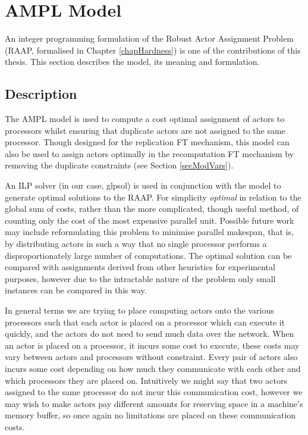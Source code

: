 \section{AMPL Model}

An integer programming formulation of the Robust Actor Assignment Problem (RAAP, formalised in Chapter \ref{chapHardness}) is one of the contributions of this thesis.
This section describes the model, its meaning and formulation.

\subsection{Description}

The AMPL model is used to compute a cost optimal assignment of actors to processors whilst ensuring that duplicate actors are not assigned to the same processor.
Though designed for the replication FT mechanism, this model can also be used to assign actors optimally in the recomputation FT mechanism by removing the duplicate constraints (see Section \ref{secModVars}).

An ILP solver (in our case, glpsol) is used in conjunction with the model to generate optimal solutions to the RAAP.
For simplicity {\em optimal} in relation to the global sum of costs, rather than the more complicated, though useful method, of counting only the cost of the most expensive parallel unit.
Possible future work may include reformulating this problem to minimise parallel makespan, that is, by distributing actors in such a way that no single processor performs a disproportionately large number of computations.
The optimal solution can be compared with assignments derived from other heuristics for experimental purposes, however due to the intractable nature of the problem only small instances can be compared in this way.

In general terms we are trying to place computing actors onto the various processors such that each actor is placed on a processor which can execute it quickly, and the actors do not need to send much data over the network.
When an actor is placed on a processor, it incurs some cost to execute, these costs may vary between actors and processors without constraint.
Every pair of actors also incurs some cost depending on how much they communicate with each other and which processors they are placed on.
Intuitively we might say that two actors assigned to the same processor do not incur this communication cost, however we may wish to make actors pay different amounts for reserving space in a machine's memory buffer, so once again no limitations are placed on these communication costs.

